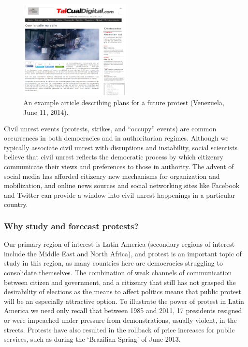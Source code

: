 \documentclass[letterpaper]{article}
\begin{document}
\begin{figure}
  \centering
    \includegraphics[width=0.5\textwidth, height=0.4\textwidth]{pp_example}
    \caption{An example article describing plans for a future protest (Venezuela, June 11, 2014).}
    \label{pp_example}
\end{figure}
Civil unrest events (protests, strikes, and ``occupy'' events) are
common occurrences in both democracies and in authoritarian regimes.
Although we typically associate civil unrest with disruptions and
instability, social scientists believe that civil unrest reflects the
democratic process by which citizenry communicate their views and
preferences to those in authority.  The advent of social media has
afforded citizenry new mechanisms for organization and mobilization, and
online news sources and social networking sites like Facebook and
Twitter can provide a window into civil unrest happenings in a
particular country.

\subsubsection{Why study and forecast protests?}
Our primary region of interest is Latin America (secondary regions of
interest include the Middle East and North Africa), and protest is an
important topic of study in this region, as many countries here are
democracies struggling to consolidate themselves. The combination of
weak channels of communication between citizen and government, and a
citizenry that still has not grasped the desirability of elections as
the means to affect politics means that public protest will be an
especially attractive option. To illustrate the power of protest in
Latin America we need only recall that between 1985 and 2011, 17
presidents resigned or were impeached under pressure from
demonstrations, usually violent, in the streets. Protests have also
resulted in the rollback of price increases for public services, such as
during the ‘Brazilian Spring’ of June 2013.
\end{document}
